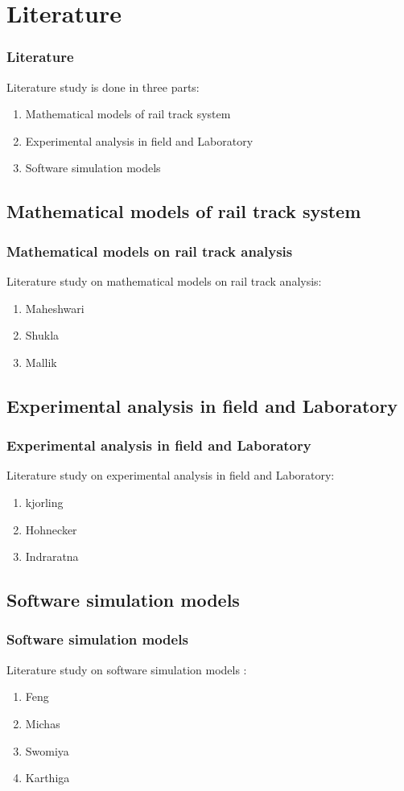 \section{Literature}
\begin{frame}
	\frametitle{Literature}
	Literature study is done in three parts:
	\begin{enumerate}
		\item Mathematical models of rail track system
		\item Experimental analysis in field and Laboratory
		\item Software simulation models 
	\end{enumerate}
\end{frame}

\subsection{Mathematical models of rail track system}
\begin{frame}
	\frametitle{Mathematical models on rail track analysis}
	Literature study on mathematical models on rail track analysis:
	\begin{enumerate}
		\item Maheshwari
		\item Shukla
		\item Mallik 
	\end{enumerate}
\end{frame}

\subsection{Experimental analysis in field and Laboratory}
\begin{frame}
	\frametitle{Experimental analysis in field and Laboratory}
	Literature study on experimental analysis in field and Laboratory:
	\begin{enumerate}
		\item kjorling
		\item Hohnecker
		\item Indraratna 
	\end{enumerate}
\end{frame}

\subsection{Software simulation models }
\begin{frame}
	\frametitle{Software simulation models }
	Literature study on software simulation models :
	\begin{enumerate}
		\item Feng
		\item Michas
		\item Swomiya
		\item Karthiga
	\end{enumerate}
\end{frame}